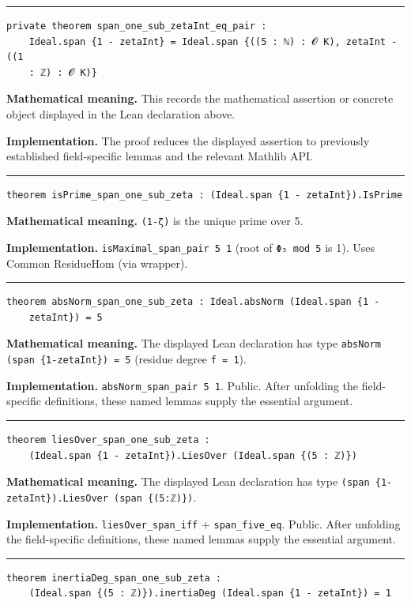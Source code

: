 \documentclass[UTF8,a4paper,11pt,fontset=fandol]{ctexart}
\theoremstyle{definition}
\newcommand{\statementsep}{\par\medskip\hrule\medskip}
\begin{document}
\statementsep
\begin{verbatim}
private theorem span_one_sub_zetaInt_eq_pair :
    Ideal.span {1 - zetaInt} = Ideal.span {((5 : ℕ) : 𝓞 K), zetaInt - ((1
    : ℤ) : 𝓞 K)}
\end{verbatim}
\noindent\textbf{Mathematical meaning.} This records the mathematical assertion or concrete object displayed in the Lean declaration above.\par
\noindent\textbf{Implementation.} The proof reduces the displayed assertion to previously established field-specific lemmas and the relevant Mathlib API.\par
\statementsep
\begin{verbatim}
theorem isPrime_span_one_sub_zeta : (Ideal.span {1 - zetaInt}).IsPrime
\end{verbatim}
\noindent\textbf{Mathematical meaning.} \texttt{(1-ζ)} is the unique prime over 5.\par
\noindent\textbf{Implementation.} \texttt{isMaximal\_\allowbreak{}span\_\allowbreak{}pair 5 1} (root of \texttt{Φ₅ mod 5} is 1). Uses Common ResidueHom (via wrapper).\par
\statementsep
\begin{verbatim}
theorem absNorm_span_one_sub_zeta : Ideal.absNorm (Ideal.span {1 -
    zetaInt}) = 5
\end{verbatim}
\noindent\textbf{Mathematical meaning.} The displayed Lean declaration has type \texttt{absNorm (span \{1-zetaInt\}) = 5} (residue degree \texttt{f = 1}).\par
\noindent\textbf{Implementation.} \texttt{absNorm\_\allowbreak{}span\_\allowbreak{}pair 5 1}. Public. After unfolding the field-specific definitions, these named lemmas supply the essential argument.\par
\statementsep
\begin{verbatim}
theorem liesOver_span_one_sub_zeta :
    (Ideal.span {1 - zetaInt}).LiesOver (Ideal.span {(5 : ℤ)})
\end{verbatim}
\noindent\textbf{Mathematical meaning.} The displayed Lean declaration has type \texttt{(span \{1-zetaInt\}).\allowbreak{}LiesOver (span \{(5:ℤ)\})}.\par
\noindent\textbf{Implementation.} \texttt{liesOver\_\allowbreak{}span\_\allowbreak{}iff} + \texttt{span\_\allowbreak{}five\_\allowbreak{}eq}. Public. After unfolding the field-specific definitions, these named lemmas supply the essential argument.\par
\statementsep
\begin{verbatim}
theorem inertiaDeg_span_one_sub_zeta :
    (Ideal.span {(5 : ℤ)}).inertiaDeg (Ideal.span {1 - zetaInt}) = 1
\end{verbatim}
\end{document}
